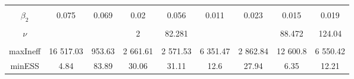 \begin{footnotesize}
\begin{singlespace}
\begin{tabular}{ccccccccc}
 & \begin{tiny} [0.161,0.414] \end{tiny}  & \begin{tiny} [0.171,0.441] \end{tiny}  & \begin{tiny} [0.121,0.297] \end{tiny}  & \begin{tiny} [0.183,0.45] \end{tiny}  & \begin{tiny} [0.284,0.432] \end{tiny}  & \begin{tiny} [0.303,0.463] \end{tiny}  & \begin{tiny} [0.271,0.414] \end{tiny}  & \begin{tiny} [0.299,0.459] \end{tiny}  \\ 
$ \beta_{2} $ & 0.075 & 0.069 & 0.02 & 0.056 & 0.011 & 0.023 & 0.015 & 0.019 \\ 
 & \begin{tiny} [-0.035,0.183] \end{tiny}  & \begin{tiny} [-0.045,0.186] \end{tiny}  & \begin{tiny} [-0.055,0.097] \end{tiny}  & \begin{tiny} [-0.06,0.171] \end{tiny}  & \begin{tiny} [-0.056,0.076] \end{tiny}  & \begin{tiny} [-0.052,0.094] \end{tiny}  & \begin{tiny} [-0.049,0.081] \end{tiny}  & \begin{tiny} [-0.053,0.091] \end{tiny}  \\ 
$\nu$ &  &  & 2 & 82.281 &  &  & 88.472 &  124.04 \\ 
 &  &  & \begin{tiny} [2,2] \end{tiny}  & \begin{tiny} [44.9, 127.5] \end{tiny}  &  &  & \begin{tiny} [76.4,98.8] \end{tiny}  & \begin{tiny} [ 116.5, 128] \end{tiny}  \\  \midrule 
maxIneff & 16 517.03 &  953.63 & 2 661.61 & 2 571.53 & 6 351.47 & 2 862.84 & 12 600.8 & 6 550.42 \\ 
minESS & 4.84 & 83.89 & 30.06 & 31.11 & 12.6 & 27.94 & 6.35 & 12.21 \\ \bottomrule 
\end{tabular}
\end{singlespace}
\end{footnotesize}


